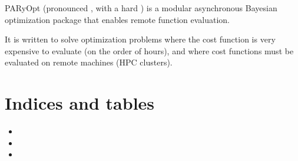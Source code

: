 \documentclass[letterpaper,12pt,english]{sphinxmanual}
\begin{document}
\begin{sphinxVerbatim}[commandchars=\\\{\}]
  \PYG{p}{[}\PYG{p}{]}
   
\end{sphinxVerbatim}

\sphinxAtStartPar
PARyOpt (pronounced , with a hard ) is a modular asynchronous Bayesian optimization package that enables
remote function evaluation.

\sphinxAtStartPar
It is written to solve optimization problems where the cost function is very expensive to evaluate
(on the order of hours), and where cost functions must be evaluated on remote machines (HPC clusters).


\chapter{Indices and tables}
\label{\detokenize{index:indices-and-tables}}\begin{itemize}
\item {} 
\sphinxAtStartPar
{}

\item {} 
\sphinxAtStartPar
{}

\item {} 
\sphinxAtStartPar
{}

\end{itemize}
\end{document}
